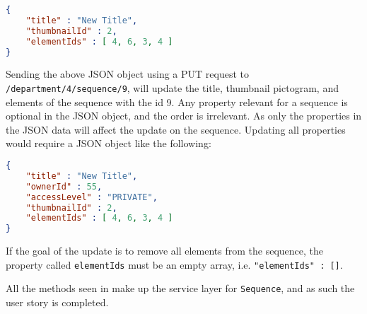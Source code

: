\begin{lstlisting}[language=json]
{
	"title" : "New Title",
	"thumbnailId" : 2,
	"elementIds" : [ 4, 6, 3, 4 ]
}
\end{lstlisting}

Sending the above JSON object using a PUT request to \texttt{/department/4/sequence/9}, will update the title, thumbnail pictogram, and elements of the sequence with the id 9.
Any property relevant for a sequence is optional in the JSON object, and the order is irrelevant.
As only the properties in the JSON data will affect the update on the sequence.
Updating all properties would require a JSON object like the following:

\begin{lstlisting}[language=json]
{
	"title" : "New Title",
	"ownerId" : 55,
	"accessLevel" : "PRIVATE",
	"thumbnailId" : 2,
	"elementIds" : [ 4, 6, 3, 4 ]
}
\end{lstlisting}

If the goal of the update is to remove all elements from the sequence, the property called \texttt{elementIds} must be an empty array, i.e. \texttt{"elementIds" : []}.

\bigskip

All the methods seen in  make up the service layer for \texttt{Sequence}, and as such the user story is completed.